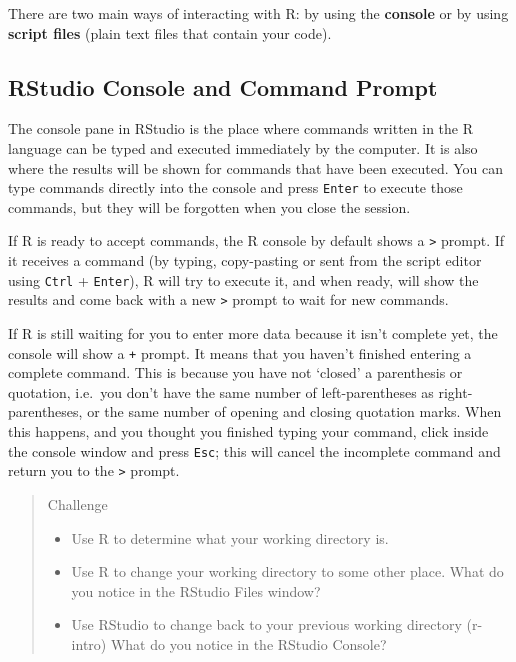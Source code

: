 \documentclass[]{book}
\providecommand{\tightlist}{%
  \setlength{\itemsep}{0pt}\setlength{\parskip}{0pt}}
\theoremstyle{definition}
\theoremstyle{definition}
\theoremstyle{definition}
\theoremstyle{remark}
\begin{document}
There are two main ways of interacting with R: by using the
\textbf{console} or by using \textbf{script files} (plain text files
that contain your code).

\subsection{RStudio Console and Command
Prompt}\label{rstudio-console-and-command-prompt}

The console pane in RStudio is the place where commands written in the R
language can be typed and executed immediately by the computer. It is
also where the results will be shown for commands that have been
executed. You can type commands directly into the console and press
\texttt{Enter} to execute those commands, but they will be forgotten
when you close the session.

If R is ready to accept commands, the R console by default shows a
\texttt{\textgreater{}} prompt. If it receives a command (by typing,
copy-pasting or sent from the script editor using \texttt{Ctrl} +
\texttt{Enter}), R will try to execute it, and when ready, will show the
results and come back with a new \texttt{\textgreater{}} prompt to wait
for new commands.

If R is still waiting for you to enter more data because it isn't
complete yet, the console will show a \texttt{+} prompt. It means that
you haven't finished entering a complete command. This is because you
have not `closed' a parenthesis or quotation, i.e.~you don't have the
same number of left-parentheses as right-parentheses, or the same number
of opening and closing quotation marks. When this happens, and you
thought you finished typing your command, click inside the console
window and press \texttt{Esc}; this will cancel the incomplete command
and return you to the \texttt{\textgreater{}} prompt.

\begin{quote}
Challenge

\begin{itemize}
\tightlist
\item
  Use R to determine what your working directory is.
\item
  Use R to change your working directory to some other place. What do
  you notice in the RStudio Files window?
\item
  Use RStudio to change back to your previous working directory
  (r-intro) What do you notice in the RStudio Console?
\end{itemize}
\end{quote}
\end{document}
